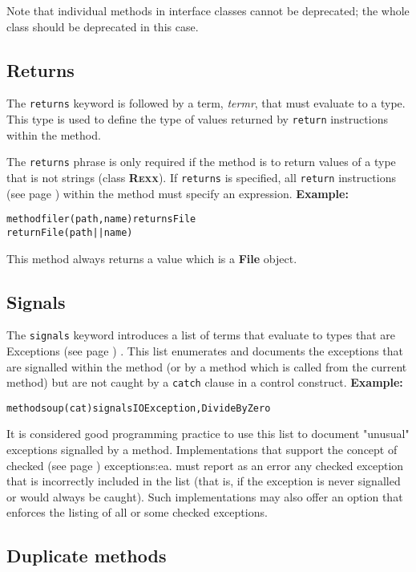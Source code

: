 Note that individual methods in interface classes cannot be
deprecated; the whole class should be deprecated in this case.
\subsection{Returns}
 
The \texttt{returns} keyword is followed by a term, \emph{termr},
that must evaluate to a type.
This type is used to define the type of values returned by
\texttt{return} instructions within the method.
 
The \texttt{returns} phrase is only required if the method is to return
values of a type that is not \nr{} strings (class \textbf{R\textsc{exx}}).
If \texttt{returns} is specified, all
 \texttt{return} instructions (see page \pageref{refreturn})  within the method must
specify an expression.
 \textbf{Example:}
\begin{alltt}
method filer(path, name) returns File
  return File(path||name)
\end{alltt}
This method always returns a value which is a \textbf{File} object.
\subsection{Signals}
 
The \texttt{signals} keyword introduces a list of terms that evaluate to
types that are  Exceptions (see page \pageref{refexcep}) .
This list enumerates and documents the exceptions that are signalled
within the method (or by a method which is called from the current
method) but are not caught by a \texttt{catch} clause in a control
construct.
 \textbf{Example:}
\begin{alltt}
method soup(cat) signals IOException, DivideByZero
\end{alltt}
 
It is considered good programming practice to use this list to document
"unusual" exceptions signalled by a method.
Implementations that support the concept of  checked (see page \pageref{refchecked}) 
exceptions:ea. must report as an error any checked exception that is
incorrectly included in the list (that is, if the exception is never
signalled or would always be caught).  Such implementations may also
offer an option that enforces the listing of all or some checked
exceptions.
\subsection{Duplicate methods}
 
